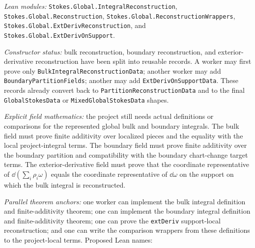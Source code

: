 \begin{definition}
  \label{anc:m6_5_global_integral_extderiv_reconstruction}
  \leanok
  \emph{Lean modules:}
  \texttt{Stokes.Global.IntegralReconstruction},
  \texttt{Stokes.Global.Reconstruction},
  \texttt{Stokes.Global.ReconstructionWrappers},
  \texttt{Stokes.Global.ExtDerivReconstruction}, and
  \texttt{Stokes.Global.ExtDerivOnSupport}.

  \emph{Constructor status:}
  bulk reconstruction, boundary reconstruction, and exterior-derivative
  reconstruction have been split into reusable records.  A worker may first
  prove only \texttt{BulkIntegralReconstructionData}; another worker may add
  \texttt{BoundaryPartitionFields}; another may add
  \texttt{ExtDerivOnSupportData}.  These records already convert back to
  \texttt{PartitionReconstructionData} and to the final
  \texttt{GlobalStokesData} or \texttt{MixedGlobalStokesData} shapes.

  \emph{Explicit field mathematics:}
  the project still needs actual definitions or comparisons for the represented
  global bulk and boundary integrals.  The bulk field must prove finite
  additivity over localized pieces and the equality with the local
  project-integral terms.  The boundary field must prove finite additivity over
  the boundary partition and compatibility with the boundary chart-change
  target terms.  The exterior-derivative field must prove that the coordinate
  representative of \(\dd(\sum_i \rho_i\omega)\) equals the coordinate
  representative of \(\dd\omega\) on the support on which the bulk integral is
  reconstructed.

  \emph{Parallel theorem anchors:}
  one worker can implement the bulk integral definition and finite-additivity
  theorem; one can implement the boundary integral definition and
  finite-additivity theorem; one can prove the \texttt{extDeriv} support-local
  reconstruction; and one can write the comparison wrappers from these
  definitions to the project-local terms.  Proposed Lean names:
\end{definition}

